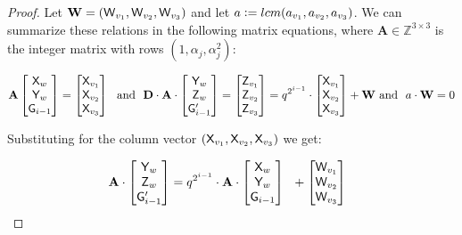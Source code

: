 \documentclass[12pt]{article}
\theoremstyle{Definition}
\begin{document}
\begin{proof}
Let $\mathbf{W} = (\mathsf{W}_{v_1}, \mathsf{W}_{v_2}, \mathsf{W}_{v_3})$ and let $a \mathrel{\mathop:}= lcm(a_{v_1}, a_{v_2}, a_{v_3})$. We can summarize these relations in the following matrix equations, where $\mathbf{A} \in \mathbb{Z}^{3\times 3}$ is the integer matrix with rows $(1, \alpha_j, \alpha_j^2)$:

$$\mathbf{A}
\begin{bmatrix}
\gr{X}_w \\ 
\gr{Y}_w \\ 
\gr{G}_{i-1}
\end{bmatrix} 
=  
\begin{bmatrix}
\gr{X}_{v_1} \\ 
\gr{X}_{v_2} \\ 
\gr{X}_{v_3}
\end{bmatrix}
\ \ \text{and} \ \ 
\mathbf{D} \cdot 
\mathbf{A} \cdot 
\begin{bmatrix}
\gr{Y}_w \\ 
\gr{Z}_w \\ 
\gr{G}'_{i-1}
\end{bmatrix} 
= 
\begin{bmatrix}
\gr{Z}_{v_1} \\ 
\gr{Z}_{v_2} \\ 
\gr{Z}_{v_3}
\end{bmatrix} 
= 
q^{2^{i-1}} \cdot 
\begin{bmatrix}
\gr{X}_{v_1} \\ 
\gr{X}_{v_2} \\ 
\gr{X}_{v_3}
\end{bmatrix}
+ 
\mathbf{W}  
\ \text{and} \ \ a \cdot \mathbf{W} = 0
$$

Substituting for the column vector $(\mathsf{X}_{v_1}, \mathsf{X}_{v_2}, \mathsf{X}_{v_3})$ we get: 

$$  \mathbf{A} \cdot 
\begin{bmatrix}
\mathsf{Y}_w \\ 
\mathsf{Z}_w \\ 
\mathsf{G}'_{i-1}
\end{bmatrix} 
= 
q^{2^{i-1}} \cdot \mathbf{A} \cdot  
\begin{bmatrix}
\mathsf{X}_{w} \\ 
\mathsf{Y}_{w} \\ 
\mathsf{G}_{i-1}
\end{bmatrix}  \ \
+ 
\begin{bmatrix}
\mathsf{W}_{v_1} \\ 
\mathsf{W}_{v_2} \\ 
\mathsf{W}_{v_3}
\end{bmatrix}  \ \
$$


\end{proof}
\end{document}

